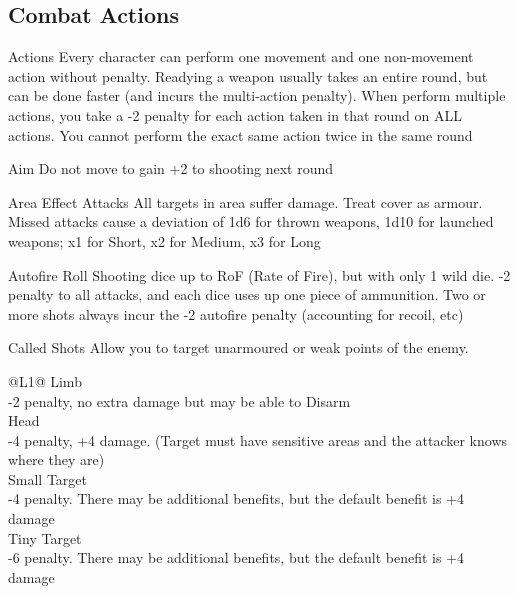 \subsection{Combat Actions}
\label{sec:rules-combat}

\begin{genericsection}{Actions}
Every character can perform one movement and one non-movement action without penalty. Readying a weapon usually takes an entire round, but can be done faster (and incurs the multi-action penalty). When perform multiple actions, you take a -2 penalty for each action taken in that round on ALL actions. You cannot perform the exact same action twice in the same round
\end{genericsection}

\begin{genericsection}{Aim}
Do not move to gain +2 to shooting next round
\end{genericsection}

\begin{genericsection}{Area Effect Attacks}
All targets in area suffer damage. Treat cover as armour. Missed attacks cause a deviation of 1d6 for thrown weapons, 1d10 for launched weapons; x1 for Short, x2 for Medium, x3 for Long
\end{genericsection}

\begin{genericsection}{Autofire}
Roll Shooting dice up to RoF (Rate of Fire), but with only 1 wild die. -2 penalty to all attacks, and each dice uses up one piece of ammunition. Two or more shots always incur the -2 autofire penalty (accounting for recoil, etc)
\end{genericsection}

\begin{genericsection}{Called Shots}
Allow you to target unarmoured or weak points of the enemy.
    \begin{redtable}{\linewidth}{@{}L{1}@{}}
      Limb\\
      -2 penalty, no extra damage but may be able to Disarm\\
      Head\\
      -4 penalty, +4 damage. (Target must have sensitive areas and the attacker knows where they are)\\
      Small Target\\
      -4 penalty. There may be additional benefits, but the default benefit is +4 damage\\
      Tiny Target\\
      -6 penalty. There may be additional benefits, but the default benefit is +4 damage\\
    \end{redtable}
\end{genericsection}

